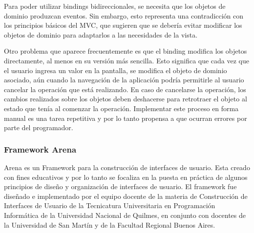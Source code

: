 	Para poder utilizar bindings bidireccionales, se necesita que los objetos de
	dominio produzcan eventos. Sin embargo, esto representa una contradicción con
	los principios básicos del MVC, que sugieren que se debería evitar modificar
	los objetos de dominio para adaptarlos a las necesidades de la vista.
	
	Otro problema que aparece frecuentemente es que el binding modifica los objetos
	directamente, al menos en su versión más 
	sencilla. 
	Esto significa que cada vez que el usuario ingresa un valor en la
	pantalla, se modifica el objeto de dominio asociado, aún cuando la navegación de la aplicación podría
	permitirle al usuario cancelar la operación que está realizando.
	En caso de cancelarse la operación, los cambios realizados sobre los objetos
	deben deshacerse para retrotraer el objeto al estado que tenía al comenzar la
	operación. Implementar este proceso en forma manual es una tarea repetitiva y
	por lo tanto propensa a que ocurran errores por parte del programador.
	
\subsubsection{Framework Arena}
	Arena es un Framework para la construcción de interfaces de usuario. 
	Esta creado con fines educativos y por lo tanto se focaliza en la puesta en
	práctica de algunos principios de diseño y organización de
	interfaces de usuario.
	El framework fue diseñado e implementado por el equipo docente de la materia de
	Construcción de Interfaces de Usuario de la Tecnicatura Universitaria en Programación
	Informática de la Universidad Nacional de Quilmes, en conjunto con docentes de
	la Universidad de San Martín y de la Facultad Regional Buenos Aires.
	
	